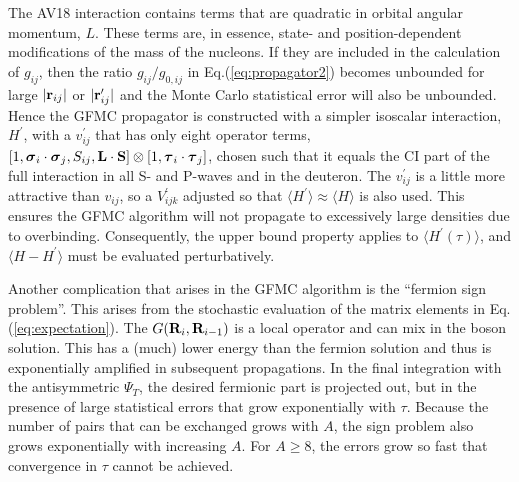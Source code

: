 The AV18 interaction contains terms that are quadratic in orbital angular
momentum, $L$.  These terms are, in essence, state- and position-dependent
modifications of the mass of the nucleons.  If they are included in
the calculation of $g_{ij}$, then the ratio $g_{ij}/g_{0,ij}$ in
Eq.(\ref{eq:propagator2}) becomes unbounded for large 
$|{\bf r}_{ij}|$ or $|{\bf r}_{ij}^{\prime}|$ and the Monte Carlo statistical
error will also be unbounded.  
Hence the GFMC propagator is constructed with a simpler isoscalar
interaction, $H^{\prime}$, with a $v^{\prime}_{ij}$
that has only eight operator terms,
$[1, \mbox{\boldmath$\sigma$}_{i}\cdot\mbox{\boldmath$\sigma$}_{j}, S_{ij}, {\bf L\cdot S}]\otimes
[1, \mbox{\boldmath$\tau$}_{i}\cdot\mbox{\boldmath$\tau$}_{j}]$, chosen such that it equals the CI
part of the full interaction in all S- and P-waves and in the deuteron.
The $v^{\prime}_{ij}$ is a little more attractive than $v_{ij}$, so
a $V^{\prime}_{ijk}$ adjusted so that
$\langle H^{\prime} \rangle \approx \langle H \rangle$ is also used.
This ensures the GFMC algorithm will not propagate to excessively large
densities due to overbinding.
Consequently, the upper bound property applies to
$\langle{H}^{\prime}(\tau)\rangle$, and $\langle H-H^{\prime} \rangle$ must
be evaluated perturbatively.

Another complication that arises in the GFMC algorithm is the ``fermion sign
problem''.
This arises from the stochastic evaluation of the matrix elements
in Eq.(\ref{eq:expectation}).  The $G({\bf R}_{i},{\bf R}_{i-1})$ is
a local operator and can mix in the boson solution.  This has a (much) lower
energy than the fermion solution and thus is exponentially amplified
in subsequent propagations.  In the final integration with the antisymmetric
$\Psi_T$, the desired fermionic part is projected out, but in the
presence of large statistical errors that grow exponentially with $\tau$.
Because the number of pairs that can be exchanged grows with $A$, the
sign problem also grows exponentially with increasing $A$.  
For $A{\geq}8$, the errors grow so fast that convergence in $\tau$ cannot
be achieved.

